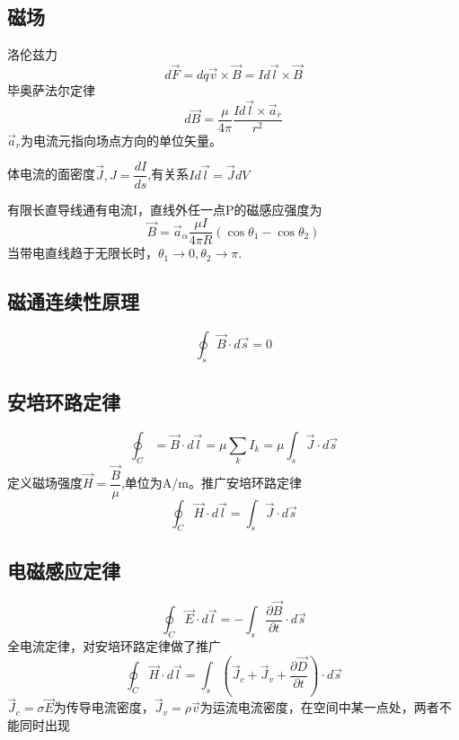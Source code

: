 \documentclass{ctexart}
\begin{document}
\subsection{磁场}
洛伦兹力
\begin{equation}
    d\vec{F}=dq \vec{v}\times \vec{B}=Id\vec{l}\times \vec{B}
\end{equation}
毕奥萨法尔定律
\begin{equation}
    d\vec{B}=\dfrac{\mu}{4\pi}\dfrac{I d \vec{l}\times\vec{a}_r}{r^2}
\end{equation}
$\vec{a}_r$为电流元指向场点方向的单位矢量。

体电流的面密度$\vec{J},J=\dfrac{dI}{ds}$,有关系$Id\vec{l}=\vec{J}dV$

有限长直导线通有电流I，直线外任一点P的磁感应强度为
\begin{equation}
    \vec{B}=\vec{a}_\alpha \dfrac{\mu I}{4 \pi R}(\cos \theta_1-\cos \theta_2)
\end{equation}
当带电直线趋于无限长时，$\theta_1 \to 0,\theta_2 \to \pi$.
\subsection{磁通连续性原理}
\begin{equation}
    \oint_s\vec{B}\cdot d\vec{s}=0
\end{equation}
\subsection{安培环路定律}
\begin{equation}
    \oint _C=\vec{B}\cdot d\vec{l}=\mu \sum_{k}I_k=\mu \int_{s}\vec{J}\cdot d\vec{s}
\end{equation}
定义磁场强度$\vec{H}=\dfrac{\vec{B}}{\mu}$,单位为A/m。推广安培环路定律
\begin{equation}
    \oint _C \vec{H}\cdot d\vec{l}=\int_{s}\vec{J}\cdot d\vec{s}
\end{equation}
\subsection{电磁感应定律}
\begin{equation}
    \oint _C \vec{E}\cdot d\vec{l}=-\int_s \dfrac{\partial \vec{B}}{\partial t}\cdot d \vec{s}
\end{equation}
全电流定律，对安培环路定律做了推广
\begin{equation}
    \oint _C \vec{H}\cdot d\vec{l}=\int_{s}(\vec{J}_c+\vec{J}_v+\dfrac{\partial \vec{D}}{\partial t})\cdot d\vec{s}
\end{equation}
$\vec{J}_c=\sigma \vec{E}$为传导电流密度，$\vec{J}_v=\rho\vec{v}$为运流电流密度，在空间中某一点处，两者不能同时出现
\end{document}
